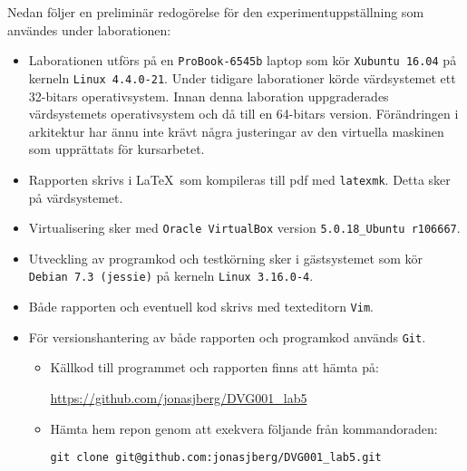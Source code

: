 Nedan följer en preliminär redogörelse för den experimentuppställning som
användes under laborationen:

\begin{itemize}
  \item Laborationen utförs på en \texttt{ProBook-6545b} laptop som kör
        \texttt{Xubuntu 16.04} på kerneln \texttt{Linux 4.4.0-21}.  Under
        tidigare laborationer körde värdsystemet ett 32-bitars operativsystem.
        Innan denna laboration uppgraderades värdsystemets operativsystem och
        då till en 64-bitars version. Förändringen i arkitektur har ännu inte
        krävt några justeringar av den virtuella maskinen som upprättats för
        kursarbetet.

  \item Rapporten skrivs i \LaTeX\  som kompileras till pdf med \texttt{latexmk}.
        Detta sker på värdsystemet.

  \item Virtualisering sker med \texttt{Oracle VirtualBox} version
        \texttt{5.0.18\_Ubuntu r106667}.

  \item Utveckling av programkod och testkörning sker i gästsystemet som kör
        \texttt{Debian 7.3 (jessie)} på kerneln \texttt{Linux 3.16.0-4}.

  \item Både rapporten och eventuell kod skrivs med texteditorn \texttt{Vim}.

  \item För versionshantering av både rapporten och programkod används \texttt{Git}.
    \begin{itemize}
      \item Källkod till programmet och rapporten finns att hämta på:

            \url{https://github.com/jonasjberg/DVG001\_lab5}

      \item Hämta hem repon genom att exekvera följande från kommandoraden:
            
            \texttt{git clone git@github.com:jonasjberg/DVG001\_lab5.git}

    \end{itemize}
\end{itemize}


